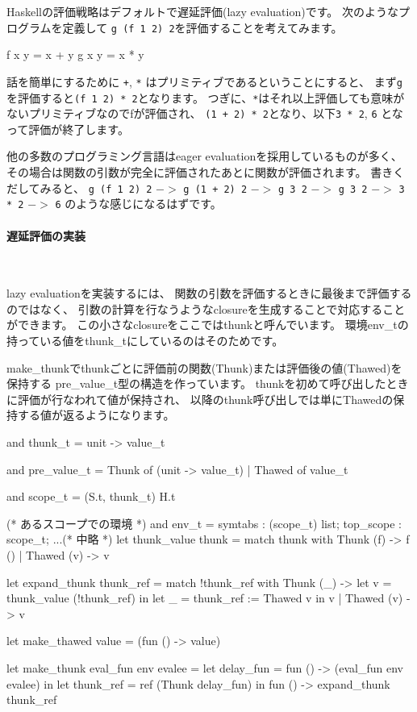 \documentclass[mingoth,a4paper]{jsarticle}
\begin{document}
Haskellの評価戦略はデフォルトで遅延評価(lazy evaluation)です。
次のようなプログラムを定義して
\verb|g (f 1 2) 2|を評価することを考えてみます。
\begin{commandline}
f x y = x + y
g x y = x * y
\end{commandline}

話を簡単にするために \verb|+|, \verb|*| はプリミティブであるということにすると、
まず\verb|g|を評価すると\verb|(f 1 2) * 2|となります。
つぎに、\verb|*|はそれ以上評価しても意味がないプリミティブなのでfが評価され、
\verb|(1 + 2) * 2|となり、以下\verb|3 * 2|, \verb|6| となって評価が終了します。

他の多数のプログラミング言語はeager evaluationを採用しているものが多く、
その場合は関数の引数が完全に評価されたあとに関数が評価されます。
書きくだしてみると、
\verb|g (f 1 2) 2| $->$  \verb|g (1 + 2) 2| $->$ \verb|g 3 2| $->$
\verb|g 3 2| $->$ \verb|3 * 2| $->$ \verb|6| のような感じになるはずです。

\paragraph{遅延評価の実装} \ 

lazy evaluationを実装するには、
関数の引数を評価するときに最後まで評価するのではなく、
引数の計算を行なうようなclosureを生成することで対応することができます。
この小さなclosureをここではthunkと呼んでいます。
環境env\_tの持っている値をthunk\_tにしているのはそのためです。

make\_thunkでthunkごとに評価前の関数(Thunk)または評価後の値(Thawed)を保持する
pre\_value\_t型の構造を作っています。
thunkを初めて呼び出したときに評価が行なわれて値が保持され、
以降のthunk呼び出しでは単にThawedの保持する値が返るようになります。

\begin{commandline}
and thunk_t = unit -> value_t

and pre_value_t =
    Thunk of (unit -> value_t)
  | Thawed of value_t

and scope_t = (S.t, thunk_t) H.t

(* あるスコープでの環境 *)
and env_t = {
  symtabs : (scope_t) list;
  top_scope : scope_t;
}
...(* 中略 *)
let thunk_value thunk =
  match thunk with
      Thunk (f) -> f ()
    | Thawed (v) -> v

let expand_thunk thunk_ref =
  match !thunk_ref with
      Thunk (_)  ->
        let v = thunk_value (!thunk_ref) in
        let _ = thunk_ref := Thawed v in
          v
    | Thawed (v) -> v

let make_thawed value =
  (fun () -> value)

let make_thunk eval_fun env evalee =
  let delay_fun = fun () -> (eval_fun env evalee) in
  let thunk_ref = ref (Thunk delay_fun) in
    fun () -> expand_thunk thunk_ref
\end{commandline}
\end{document}
